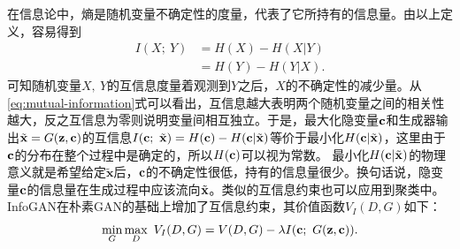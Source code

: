 在信息论中，熵是随机变量不确定性的度量，代表了它所持有的信息量。由以上定义，容易得到
\begin{equation}
  \begin{split}
    I(X;~Y) &= H(X) - H(X|Y) \\
    &= H(Y) - H(Y|X).
  \end{split}
\end{equation}
可知随机变量$X,~Y$的互信息度量着观测到$Y$之后，$X$的不确定性的减少量。从\eqref{eq:mutual-information}式可以看出，互信息越大表明两个随机变量之间的相关性越大，反之互信息为零则说明变量间相互独立。于是，最大化隐变量$\mathbf{c}$和生成器输出$\tilde{\mathbf{x}} = G(\mathbf{z}, \mathbf{c})$的互信息$I(\mathbf{c}; ~\tilde{\mathbf{x}}) = H(\mathbf{c}) - H(\mathbf{c}|\tilde{\mathbf{x}})$等价于最小化$H(\mathbf{c}|\tilde{\mathbf{x}})$，这里由于$\mathbf{c}$的分布在整个过程中是确定的，所以$H(\mathbf{c})$可以视为常数。
最小化$H(\mathbf{c}|\tilde{\mathbf{x}})$的物理意义就是希望给定$\tilde{\mathbf{x}}$后，$\mathbf{c}$的不确定性很低，持有的信息量很少。换句话说，隐变量$\mathbf{c}$的信息量在生成过程中应该流向$\tilde{\mathbf{x}}$。类似的互信息约束也可以应用到聚类中\citep{bridle1992unsupervised,barber2006kernelized,krause2010discriminative}。InfoGAN在朴素GAN的基础上增加了互信息约束，其价值函数$V_I(D,G)$如下：
\begin{equation}
  \min_G\max_D ~V_I(D,G) = V(D,G) - \lambda I(\mathbf{c};~G(\mathbf{z},\mathbf{c})).
\end{equation}


